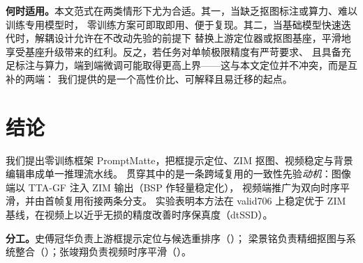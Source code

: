 \documentclass[final]{cvpr}
\begin{document}
\noindent\textbf{何时适用。}本文范式在两类情形下尤为合适。其一，当缺乏抠图标注或算力、难以训练专用模型时，
零训练方案可即取即用、便于复现。其二，当基础模型快速迭代时，解耦设计允许在不改动先验的前提下
替换上游定位器或抠图基座，平滑地享受基座升级带来的红利。反之，若任务对单帧极限精度有严苛要求、
且具备充足标注与算力，端到端微调可能取得更高上界——这与本文定位并不冲突，而是互补的两端：
我们提供的是一个高性价比、可解释且易迁移的起点。

\section{结论}
\label{sec:conclusion}
我们提出零训练框架 PromptMatte，把框提示定位、ZIM 抠图、视频稳定与背景编辑串成单一推理流水线。
贯穿其中的是一条跨域复用的一致性先验\emph{动机}：图像端以 TTA-GF 注入 ZIM 输出（BSP 作轻量稳定化），
视频端推广为双向时序平滑，并由首帧复用衔接两条分支。
实验表明本方法在 valid706 上稳定优于 ZIM 基线，在视频上以近乎无损的精度改善时序保真度（dtSSD）。

\medskip
\noindent\textbf{分工。}史傅冠华负责上游框提示定位与候选重排序（）；
梁景铭负责精细抠图与系统整合（）；张竣翔负责视频时序平滑（）。
\end{document}
